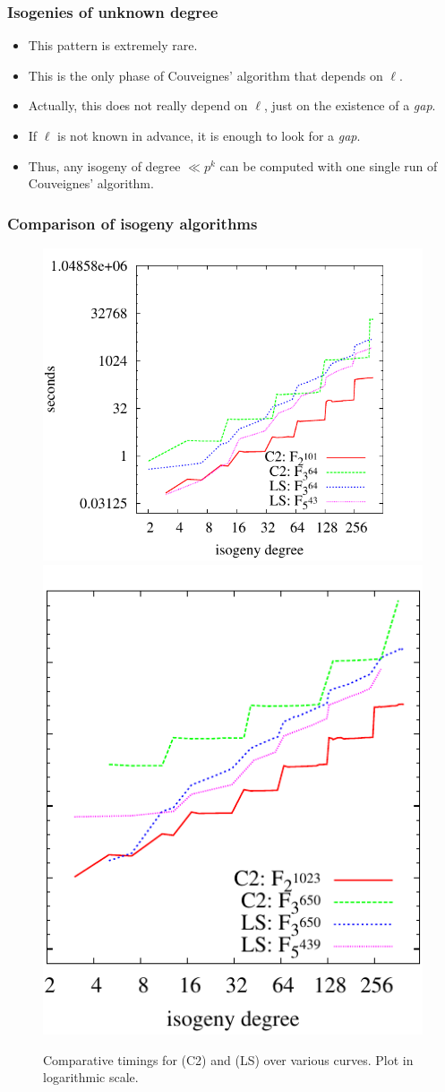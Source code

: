 \documentclass[10pt,usepdftitle=false]{beamer}
\begin{document}
\begin{frame}
  \frametitle{Isogenies of unknown degree}
  
  \begin{itemize}
  \item This pattern is extremely rare.
  \item This is the only phase of Couveignes' algorithm that depends on $\ell$.
  \end{itemize}

  \begin{itemize}
  \item<2-> \large Actually, this does not really depend on $\ell$,
    just on the existence of a \emph{gap}.
  \item<2-> \large If $\ell$ is not known in advance, it is enough to
    look for a \emph{gap}.
  \item<2-> \large Thus, any isogeny of degree $\ll p^k$ can be
    computed with one single run of Couveignes' algorithm.
  \end{itemize}  
\end{frame}


\begin{frame}
  \frametitle{Comparison of isogeny algorithms}
  
  \begin{figure}
    \centering
    \includegraphics[height=0.5\textwidth]{../isogeny/C2-LS}
    \includegraphics[height=0.5\textwidth]{../isogeny/C2-LS2}
    \caption{Comparative timings for \cite{couveignes96} (C2) and
      \cite{lercier+sirvent08} (LS) over various curves. Plot in
      logarithmic scale.}
  \label{fig:comp}
\end{figure}
\end{frame}
\end{document}
